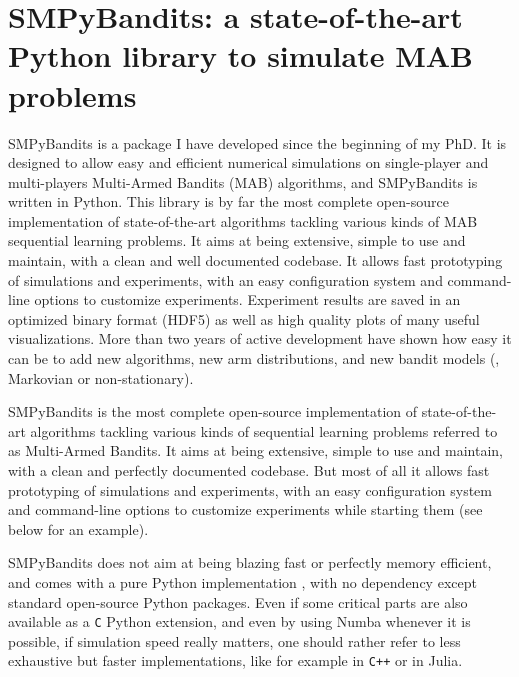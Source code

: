 
\chapter{SMPyBandits: a state-of-the-art Python library to simulate MAB problems}
\label{chapter:3}
\minitoc

SMPyBandits is a package I have developed since the beginning of my PhD.
It is designed to allow easy and efficient numerical simulations on single-player and multi-players Multi-Armed Bandits (MAB) algorithms, and SMPyBandits is written in Python.
This library is by far the most complete open-source implementation of state-of-the-art algorithms tackling various kinds of MAB sequential learning problems.
It aims at being extensive, simple to use and maintain, with a clean and well documented codebase.
It allows fast prototyping of simulations and experiments, with an easy configuration system and command-line options to customize experiments.
Experiment results are saved in an optimized binary format (HDF5) as well as high quality plots of many useful visualizations.
%
More than two years of active development have shown how easy it can be to add new algorithms, new arm distributions, and new bandit models (\eg, Markovian or non-stationary).

\newpage
\graphicspath{{2-Chapters/3-Chapter/Images/}}


SMPyBandits is the most complete open-source implementation of state-of-the-art algorithms tackling various kinds of sequential learning problems referred to as Multi-Armed Bandits.
It aims at being extensive, simple to use and maintain, with a clean and perfectly documented codebase. But most of all it allows fast prototyping of simulations and experiments, with an easy configuration system and command-line options to customize experiments while starting them (see below for an example).

SMPyBandits does not aim at being blazing fast or perfectly memory efficient, and comes with a pure Python implementation \cite{python}, with no dependency except standard open-source Python packages.
Even if some critical parts are also available as a \texttt{C} Python extension, and even by using Numba \cite{numba} whenever it is possible, if simulation speed really matters, one should rather refer to less exhaustive but faster implementations, like for example \cite{TorLibbandit} in \texttt{C++} or \cite{VishMABjl} in Julia.

